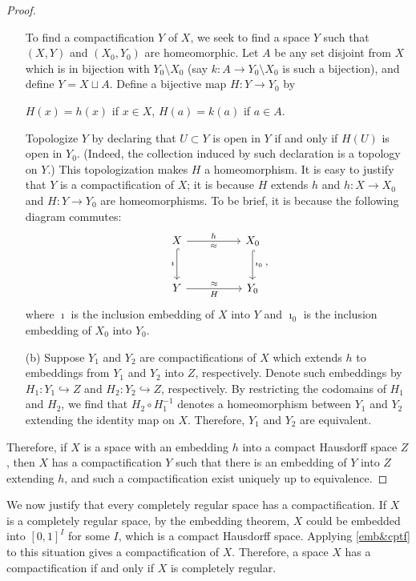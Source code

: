 \begin{proof}
\begin{enumerate}
{            To find a compactification $Y$ of $X$, we seek to find a space $Y$ such that $(X, Y)$ and $(X_0, Y_0)$ are homeomorphic.
            Let $A$ be any set disjoint from $X$ which is in bijection with $Y_0\setminus X_0$ (say $k: A\rightarrow Y_0\setminus X_0$ is such a bijection), and define $Y=X\sqcup A$.
            Define a bijective map $H: Y\rightarrow Y_0$ by
            \begin{center}
                $H(x)=h(x)$ if $x\in X$, $H(a)=k(a)$ if $a\in A$.
            \end{center}
            Topologize $Y$ by declaring that $U\subset Y$ is open in $Y$ if and only if $H(U)$ is open in $Y_0$. (Indeed, the collection induced by such declaration is a topology on $Y$.)
            This topologization makes $H$ a homeomorphism.
            It is easy to justify that $Y$ is a compactification of $X$; it is because $H$ extends $h$ and $h: X\rightarrow X_0$ and $H: Y\rightarrow Y_0$ are homeomorphisms.
            To be brief, it is because the following diagram commutes:
            \begin{equation*}
                \begin{tikzcd}[row sep=large, column sep=huge]
                    X\arrow[r, "h", "\approx"']\arrow[d, "\imath"', hook]
                    &
                    X_0\arrow[d, "\imath_0", hook]\\
                    Y\arrow[r, "\approx", "H"'] & Y_0
                \end{tikzcd},
            \end{equation*}
            where $\imath$ is the inclusion embedding of $X$ into $Y$ and $\imath_0$ is the inclusion embedding of $X_0$ into $Y_0$.
        }
        \item[(b)]
        {
            Suppose $Y_1$ and $Y_2$ are compactifications of $X$ which extends $h$ to embeddings from $Y_1$ and $Y_2$ into $Z$, respectively.
            Denote such embeddings by $H_1: Y_1\hookrightarrow Z$ and $H_2: Y_2\hookrightarrow Z$, respectively.
            By restricting the codomains of $H_1$ and $H_2$, we find that $H_2\circ H_1^{-1}$ denotes a homeomorphism between $Y_1$ and $Y_2$ extending the identity map on $X$.
            Therefore, $Y_1$ and $Y_2$ are equivalent.
        }
    \end{enumerate}
    Therefore, if $X$ is a space with an embedding $h$ into a compact Hausdorff space $Z$, then $X$ has a compactification $Y$ such that there is an embedding of $Y$ into $Z$ extending $h$, and such a compactification exist uniquely up to equivalence.
\end{proof}
\begin{rmk}
    We now justify that every completely regular space has a compactification.
    If $X$ is a completely regular space, by the embedding theorem, $X$ could be embedded into $[0, 1]^I$ for some $I$, which is a compact Hausdorff space.
    Applying \cref{emb&cptf} to this situation gives a compactification of $X$.
    Therefore, a space $X$ has a compactification if and only if $X$ is completely regular.
\end{rmk}
